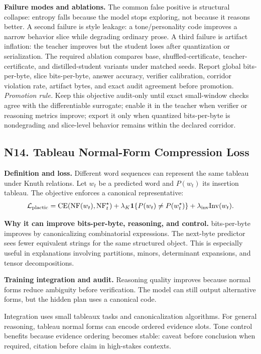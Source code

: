 \documentclass[10pt]{article}
\newcommand{\loss}{\mathcal{L}}
\numberwithin{equation}{section}
\begin{document}
\noindent\textbf{Failure modes and ablations.} The common false positive is structural collapse: entropy falls because the model stops exploring, not because it reasons better. A second failure is style leakage: a tone/personality code improves a narrow behavior slice while degrading ordinary prose. A third failure is artifact inflation: the teacher improves but the student loses after quantization or serialization. The required ablation compares base, shuffled-certificate, teacher-certificate, and distilled-student variants under matched seeds. Report global bits-per-byte, slice bits-per-byte, answer accuracy, verifier calibration, corridor violation rate, artifact bytes, and exact audit agreement before promotion.
\vfill
\noindent\emph{Promotion rule.} Keep this objective audit-only until exact small-window checks agree with the differentiable surrogate; enable it in the teacher when verifier or reasoning metrics improve; export it only when quantized bits-per-byte is nondegrading and slice-level behavior remains within the declared corridor.
\clearpage
\subsection{N14. Tableau Normal-Form Compression Loss}
\noindent\textbf{Definition and loss.} Different word sequences can represent the same tableau under Knuth relations. Let $w_t$ be a predicted word and $P(w_t)$ its insertion tableau. The objective enforces a canonical representative:
\[
\loss_{\rm plactic}=\mathrm{CE}(\mathrm{NF}(w_t),\mathrm{NF}^\star_t)+\lambda_K\mathbf 1\{P(w_t)\ne P(w_t^\star)\}+\lambda_{\rm inv}\mathrm{Inv}(w_t).
\]

\noindent\textbf{Why it can improve bits-per-byte, reasoning, and control.} bits-per-byte improves by canonicalizing combinatorial expressions. The next-byte predictor sees fewer equivalent strings for the same structured object. This is especially useful in explanations involving partitions, minors, determinant expansions, and tensor decompositions.

\noindent\textbf{Training integration and audit.} Reasoning quality improves because normal forms reduce ambiguity before verification. The model can still output alternative forms, but the hidden plan uses a canonical code.

Integration uses small tableaux tasks and canonicalization algorithms. For general reasoning, tableau normal forms can encode ordered evidence slots. Tone control benefits because evidence ordering becomes stable: caveat before conclusion when required, citation before claim in high-stakes contexts.
\end{document}
